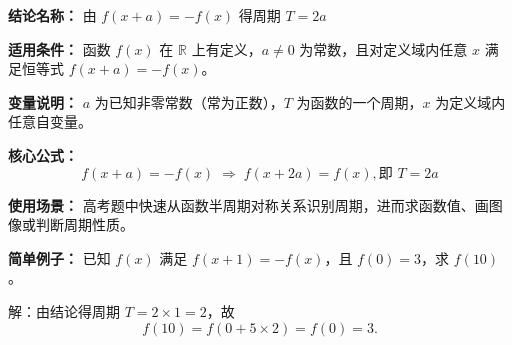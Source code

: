 \textbf{结论名称：} 由 \( f(x+a) = -f(x) \) 得周期 \( T = 2a \)

\textbf{适用条件：} 函数 \( f(x) \) 在 \( \mathbb{R} \) 上有定义，\( a \neq 0 \) 为常数，且对定义域内任意 \( x \) 满足恒等式 \( f(x+a) = -f(x) \)。

\textbf{变量说明：} \( a \) 为已知非零常数（常为正数），\( T \) 为函数的一个周期，\( x \) 为定义域内任意自变量。

\textbf{核心公式：}
\[
\boxed{f(x+a) = -f(x) \;\Longrightarrow\; f(x+2a) = f(x), \text{即 } T = 2a}
\]

\textbf{使用场景：} 高考题中快速从函数半周期对称关系识别周期，进而求函数值、画图像或判断周期性质。

\textbf{简单例子：} 已知 \( f(x) \) 满足 \( f(x+1) = -f(x) \)，且 \( f(0) = 3 \)，求 \( f(10) \)。

解：由结论得周期 \( T = 2 \times 1 = 2 \)，故
\[
f(10) = f(0 + 5 \times 2) = f(0) = 3.
\]
